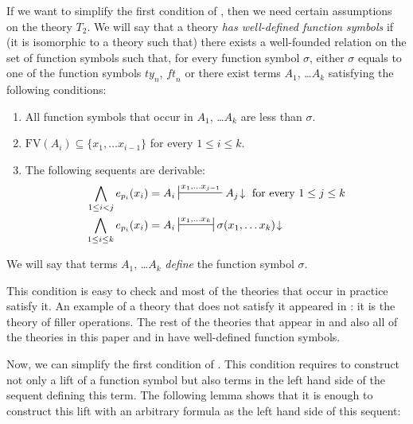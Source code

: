 \documentclass[reqno]{amsart}
\theoremstyle{definition}
\theoremstyle{remark}
\newcommand{\FV}{\mathrm{FV}}
\newcommand{\ft}{\mathit{ft}}
\newcommand{\ty}{\mathit{ty}}
\numberwithin{figure}{section}
\begin{document}
If we want to simplify the first condition of , then we need certain assumptions on the theory $T_2$.
We will say that a theory \emph{has well-defined function symbols} if (it is isomorphic to a theory such that) there exists a well-founded relation on the set of function symbols such that,
for every function symbol $\sigma$, either $\sigma$ equals to one of the function symbols $\ty_n$, $\ft_n$ or there exist terms $A_1$, \ldots $A_k$ satisfying the following conditions:
\begin{enumerate}
\item All function symbols that occur in $A_1$, \ldots $A_k$ are less than $\sigma$.
\item $\FV(A_i) \subseteq \{ x_1, \ldots x_{i-1} \}$ for every $1 \leq i \leq k$.
\item The following sequents are derivable:
\begin{align*}
\bigwedge_{1 \leq i < j} e_{p_i}(x_i) = A_i & \sststile{}{x_1, \ldots x_{j-1}} A_j\!\downarrow \text{ for every } 1 \leq j \leq k \\
\bigwedge_{1 \leq i \leq k} e_{p_i}(x_i) = A_i & \ssststile{}{x_1, \ldots x_k} \sigma(x_1, \ldots x_k)\!\downarrow
\end{align*}
\end{enumerate}
We will say that terms $A_1$, \ldots $A_k$ \emph{define} the function symbol $\sigma$.

This condition is easy to check and most of the theories that occur in practice satisfy it.
An example of a theory that does not satisfy it appeared in \cite{alg-models}: it is the theory of filler operations.
The rest of the theories that appear in \cite{alg-models} and also all of the theories in this paper and in \cite{alg-tt} have well-defined function symbols.

Now, we can simplify the first condition of .
This condition requires to construct not only a lift of a function symbol but also terms in the left hand side of the sequent defining this term.
The following lemma shows that it is enough to construct this lift with an arbitrary formula as the left hand side of this sequent:
\end{document}
